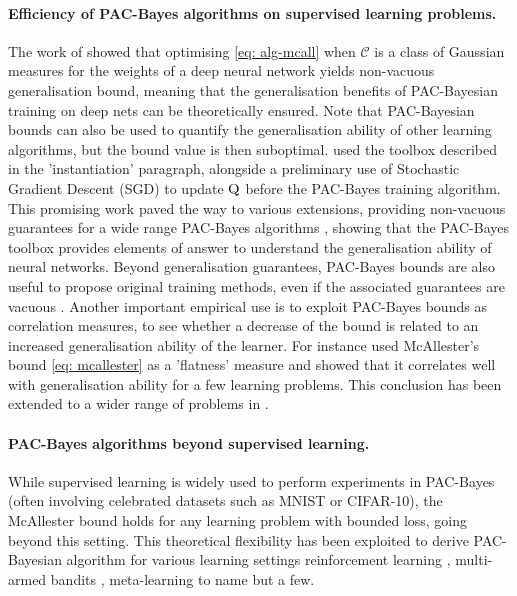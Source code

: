 \paragraph{Efficiency of PAC-Bayes algorithms on supervised learning problems.}
The work of \citet{dziugaite2017computing} showed that optimising \eqref{eq: alg-mcall} when $\mathcal{C}$ is a class of Gaussian measures for the weights of a deep neural network yields non-vacuous generalisation bound, meaning that the generalisation benefits of PAC-Bayesian training on deep nets can be theoretically ensured. Note that PAC-Bayesian bounds can also be used to quantify the generalisation ability of other learning algorithms, but the bound value is then suboptimal.  \citet{dziugaite2017computing} used the toolbox described in the 'instantiation' paragraph, alongside a preliminary use of Stochastic Gradient Descent (SGD) to update $\mathrm{Q}$ before the PAC-Bayes training algorithm. This promising work paved the way to various extensions, providing non-vacuous guarantees for a wide range PAC-Bayes algorithms \citep{rivasplata2019pac,letarte2019dichotomize,perezortiz2021learning,perez2021progress,perez2021tighter,dziugaite2021role,biggs2022non,biggs2023tighter}, showing that the PAC-Bayes toolbox provides elements of answer to understand the generalisation ability of neural networks. Beyond generalisation guarantees, PAC-Bayes bounds are also useful to propose original training methods, even if the associated guarantees are vacuous \citep{biggs2021differentiable,biggs2022margin}. Another important empirical use is to exploit PAC-Bayes bounds as correlation measures, to see whether a decrease of the bound is related to an increased generalisation ability of the learner. For instance \citet{neyshabur2017explor} used McAllester's bound \eqref{eq: mcallester} as a 'flatness' measure and showed that it correlates well with generalisation ability for a few learning problems. This conclusion has been extended to a wider range of problems in \citet{jiang2020fantastic,dziugaite2020search}. 

\paragraph{PAC-Bayes algorithms beyond supervised learning.} While supervised learning is widely used to perform experiments in PAC-Bayes (often involving celebrated datasets such as MNIST or CIFAR-10), the McAllester bound holds for any learning problem with bounded loss, going beyond this setting. This theoretical flexibility has been exploited to derive PAC-Bayesian algorithm for various learning settings reinforcement learning \citep{fard2010pac}, multi-armed bandits \citep{seldin2011pac,seldin2012pac,sakhi2023pac}, meta-learning \citep{amit2018meta,farid2021generalization,rothfuss2021pacoh,rothfuss2022pac,ding2021bridging} to name but a few. 

